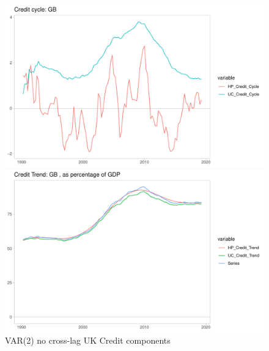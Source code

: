 \documentclass[fleqn]{article}
\begin{document}
\begin{outline}[enumerate]
\begin{figure}[h!]
	\caption{VAR(2) no cross-lag UK Credit components}	
	\centerline{\includegraphics[scale=0.7]{../Output/Graphs/Credit_cycle_GB.pdf}}
	\centerline{\includegraphics[scale=0.7]{../Output/Graphs/Credit_trend_GB.pdf}}
\end{figure}


\end{outline}
\end{document}
